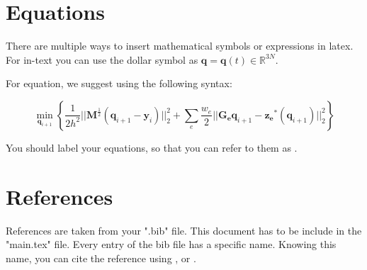 \section{Equations}\label{equations}

There are multiple ways to insert mathematical symbols or expressions in latex. For in-text you can use the dollar symbol as $\bm{q}=\bm{q}(t)\in \mathbb{R}^{3N}$. 

For equation, we suggest using the following syntax:

    \begin{equation}\label{optimization_problem}
        \min_{\bm{q}_{i+1}}\left\{ \frac{1}{2h^2}||\bm{M}^{\frac{1}{2}}(\bm{q}_{i+1}-\bm{y}_i)||_2^2 + \sum_e \frac{w_e}{2}||\bm{G_e}\bm{q}_{i+1}-\bm{z_e}^\ast (\bm{q}_{i+1})||_2^2 \right\}
    \end{equation}
    
You should label your equations, so that you can refer to them as .


\section{References}\label{references}

References are taken from your ".bib" file. This document has to be include in the "main.tex" file. Every entry of the bib file has a specific name. Knowing this name, you can cite the reference using \citep{Bouaziz2014}, \citet{Bouaziz2014} or \cite{Bouaziz2014}. 
